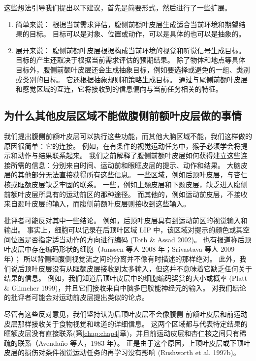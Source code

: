 这些想法引导我们提出以下建议，首先是简要形式，然后进行了一些扩展。
\begin{enumerate}
\item 简单来说：
根据当前需求评估，腹侧前额叶皮层生成适合当前环境和期望结果的目标。 
目标可以是对象、位置或动作，可以是具体的也可以是抽象的。
\item  展开来说：
腹侧前额叶皮层根据构成当前环境的视觉和听觉信号生成目标。 
目标的产生还取决于根据当前需求评估的预期结果。 
除了物体和地点等具体目标外，腹侧前额叶皮层还会生成抽象目标，例如要选择或避免的一组、类别或类别的目标。 
它还根据抽象规则和策略生成目标。 通过与尾侧前额叶皮层和感觉区域的互连，它将接收到的信息偏向与当前任务相关的特征。
\end{enumerate}



\subsection{为什么其他皮层区域不能做腹侧前额叶皮层做的事情}
\par

我们提出腹侧前额叶皮层可以执行这些功能，而其他大脑区域不能，我们这样做的原因很简单：它的连接。 
例如，在有条件的视觉运动任务中，猴子必须学会将提示和动作与结果联系起来。 
我们之前解释了腹侧前额叶皮层如何获得建立这些连接所需的信息：分别来自时间、运动前和眼眶皮层的提示、动作和结果。 
大脑皮层的其他部分无法直接获得所有这些信息。 
一些区域，例如后顶叶皮层，与杏仁核或眶额皮层缺乏牢固的联系。 
一些，例如上颞皮层和下颞皮层，缺乏进入腹侧前额叶皮层所具有的运动前区的那种途径。 
而其他的，例如运动前皮层，不接收来自颞叶皮层的输入，而腹侧前额叶皮层则接收到这些输入。
\par


批评者可能反对其中一些结论。 
例如，后顶叶皮层具有到运动前区的视觉输入和输出。 
事实上，细胞可以记录在后顶叶区域 LIP 中，该区域对提示的颜色或其空间位置是否指定适当动作的方向进行编码 (Toth \& Assad 2002)。 
也有报道称后顶叶皮层中存在编码形状的细胞（Janssen 等人 2008 年；Srivastava 等人 2009 年）； 所以背侧和腹侧视觉流之间的分离并不像有时描述的那样绝对。
此外，我们说后顶叶皮层没有从眶额皮层接收到太多输入，但这并不意味着它缺乏任何关于结果的信息。 
例如，我们知道后顶叶皮层中的细胞编码奖赏的大小或概率 (Platt \& Glimcher 1999)，并且它们接收来自中脑多巴胺能神经元的输入。
对我们结论的批评者可能会对运动前皮层提出类似的论点。
\par


尽管有这些反对意见，我们坚持认为后顶叶皮层不会像腹侧 前额叶皮层和前运动皮层那样接收关于食物视觉和味道的详细信息。 
这两个区域都与代表特定结果的眶额皮层没有直接联系(第\ref{chap:chap4}章)，并且前运动皮层和杏仁核之间只有稀疏的联系（Avendaño 等人，1983 年）。 
正是由于这个原因，上顶叶皮层或下顶叶皮层的损伤对条件视觉运动任务的再学习没有影响 (Rushworth et al. 1997b)。
\par 


